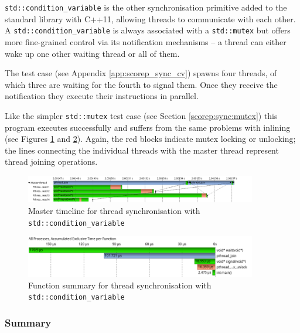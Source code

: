 \texttt{std::condition\_variable} is the other synchronisation primitive added to the standard library with C++11, allowing threads to communicate with each other. A \texttt{std::condition\_variable} is always associated with a \texttt{std::mutex} but offers more fine-grained control via its notification mechanisms -- a thread can either wake up one other waiting thread or all of them.

The test case (see Appendix \ref{app:scorep_sync_cv}) spawns four threads, of which three are waiting for the fourth to signal them. Once they receive the notification they execute their instructions in parallel.

Like the simpler \texttt{std::mutex} test case (see Section \ref{scorep:sync:mutex}) this program executes successfully and suffers from the same problems with inlining (see Figures \ref{scorep:sync_pthread_cv_timeline} and \ref{scorep:sync_pthread_cv_summary}). Again, the red blocks indicate mutex locking or unlocking; the lines connecting the individual threads with the master thread represent thread joining operations.

\begin{figure}[htbp]
	\begin{center}
		\includegraphics[width=0.9\textwidth]{img/scorep_pthread_cv_timeline.png}
		\caption{Master timeline for thread synchronisation with \texttt{std::condition\_variable}}
		\label{scorep:sync_pthread_cv_timeline}
	\end{center}
\end{figure}

\begin{figure}[htbp]
	\begin{center}
		\includegraphics[width=0.9\textwidth]{img/scorep_pthread_cv_summary.png}
		\caption{Function summary for thread synchronisation with \texttt{std::condition\_variable}}
		\label{scorep:sync_pthread_cv_summary}
	\end{center}
\end{figure}

\subsubsection{Summary}


